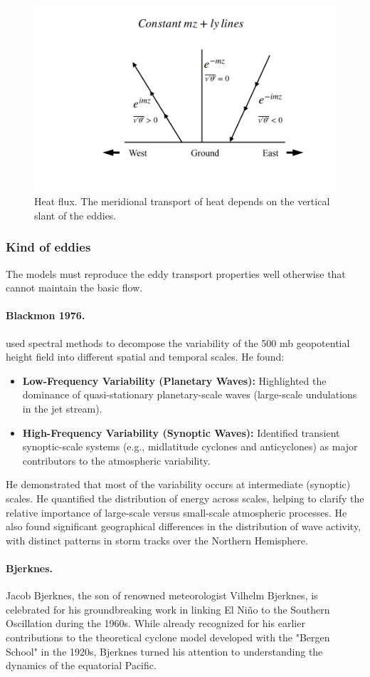 \begin{figure}[htp!]
	\centering
	\includegraphics[width=0.5\linewidth]{uploads/Screenshot 2024-11-24 185505.png}
	\caption{Heat flux. The meridional transport of heat depends on the vertical slant of the eddies.}
	\label{fig:enter-label}
\end{figure}
\subsubsection{Kind of eddies}
The models must reproduce the eddy transport properties well otherwise that cannot maintain the basic flow.
\paragraph{Blackmon 1976.}\cite{Black76}  used spectral methods to decompose the variability of the 500 mb geopotential height field into different spatial and temporal scales. He found:
\begin{itemize}
	\item \textbf{Low-Frequency Variability (Planetary Waves):} Highlighted the dominance of quasi-stationary planetary-scale waves (large-scale undulations in the jet stream).
	\item \textbf{High-Frequency Variability (Synoptic Waves):} Identified transient synoptic-scale systems (e.g., midlatitude cyclones and anticyclones) as major contributors to the atmospheric variability.
\end{itemize}
He demonstrated that most of the variability occurs at intermediate (synoptic) scales. He quantified the distribution of energy across scales, helping to clarify the relative importance of large-scale versus small-scale atmospheric processes. He also found significant geographical differences in the distribution of wave activity, with distinct patterns in storm tracks over the Northern Hemisphere.

\paragraph{Bjerknes.} Jacob Bjerknes, the son of renowned meteorologist Vilhelm Bjerknes, is celebrated for his groundbreaking work in linking El Niño to the Southern Oscillation during the 1960s. While already recognized for his earlier contributions to the theoretical cyclone model developed with the "Bergen School" in the 1920s, Bjerknes turned his attention to understanding the dynamics of the equatorial Pacific.

